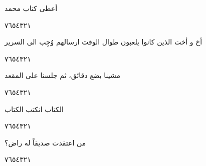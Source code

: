 \documentclass[11pt, a4paper]{article}
\begin{document}
{\vspace{0.5\baselineskip}\begin{flushright}
\textarabic{أعطى كتاب محمد}
\end{flushright}

\begin{center}
        \hfill\textarabic{٧}\hfill\textarabic{٦}\hfill\textarabic{٥}\hfill\textarabic{٤}\hfill\textarabic{٣}\hfill\textarabic{٢}\hfill\textarabic{١}
        \end{center}


\vspace{0.5\baselineskip}\begin{flushright}
\textarabic{أخ و أخت الذين كانوا يلعبون طوال الوقت ارسالهم وُجِب الى السرير}
\end{flushright}

\begin{center}
        \hfill\textarabic{٧}\hfill\textarabic{٦}\hfill\textarabic{٥}\hfill\textarabic{٤}\hfill\textarabic{٣}\hfill\textarabic{٢}\hfill\textarabic{١}
        \end{center}


\vspace{0.5\baselineskip}\begin{flushright}
\textarabic{مشينا بضع دقائق، ثم جلسنا على المقعد}
\end{flushright}

\begin{center}
        \hfill\textarabic{٧}\hfill\textarabic{٦}\hfill\textarabic{٥}\hfill\textarabic{٤}\hfill\textarabic{٣}\hfill\textarabic{٢}\hfill\textarabic{١}
        \end{center}


\vspace{0.5\baselineskip}\begin{flushright}
\textarabic{الكتاب انكتب الكتاب}
\end{flushright}

\begin{center}
        \hfill\textarabic{٧}\hfill\textarabic{٦}\hfill\textarabic{٥}\hfill\textarabic{٤}\hfill\textarabic{٣}\hfill\textarabic{٢}\hfill\textarabic{١}
        \end{center}


\vspace{0.5\baselineskip}\begin{flushright}
\textarabic{من اعتقدت صديقاً له راض؟}
\end{flushright}

\begin{center}
        \hfill\textarabic{٧}\hfill\textarabic{٦}\hfill\textarabic{٥}\hfill\textarabic{٤}\hfill\textarabic{٣}\hfill\textarabic{٢}\hfill\textarabic{١}
        \end{center}


}
\end{document}
